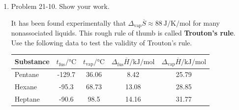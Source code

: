 \documentclass[../psets.tex]{subfiles}
\begin{document}
\begin{enumerate}
\begin{align*}
    \end{align*}
    \begin{proof}[Answer]
        The total differential of $U(T,V)$ is
        \begin{equation*}
            \dd{U} = \left( \pdv{U}{T} \right)_V\dd{T}+\left( \pdv{U}{V} \right)_T\dd{V}
        \end{equation*}
        Thus, we have that
        \begin{align*}
            T\dd{S}-P\dd{V} &= \left( \pdv{U}{T} \right)_V\dd{T}+\left( \pdv{U}{V} \right)_T\dd{V}\\
            \dd{S} &= \frac{1}{T}\left( \pdv{U}{T} \right)_V\dd{T}+\frac{1}{T}\left[ P+\left( \pdv{U}{V} \right)_T \right]\dd{V}\\
            &= \frac{C_V}{T}\dd{T}+\frac{1}{T}\left[ P+\left( \pdv{U}{V} \right)_T \right]\dd{V}
        \end{align*}
        The two equations follow by comparing the above with the total differential for $S(T,V)$, given by
        \begin{equation*}
            \dd{S} = \left( \pdv{S}{T} \right)_V\dd{T}+\left( \pdv{S}{V} \right)_T\dd{V}
        \end{equation*}
    \end{proof}
    \item Problem 21-10. Show your work.\par
    It has been found experimentally that $\Delta_\text{vap}\overline{S}\approx\SI{88}{\joule\per\kelvin\per\mole}$ for many nonassociated liquids. This rough rule of thumb is called \textbf{Trouton's rule}. Use the following data to test the validity of Trouton's rule.
    \begin{center}
        \small
        \renewcommand{\arraystretch}{1.2}
        \begin{tabular}{
            l
            c
            S[table-format=3.2]
            S[table-format=2.2]
            S[table-format=2.2]
        }
            \toprule
            Substance & {$t_\text{fus}/\si{\celsius}$} & {$t_\text{vap}/\si{\celsius}$} & {$\Delta_\text{fus}\overline{H}/\si{\kilo\joule\per\mole}$} & {$\Delta_\text{vap}\overline{H}/\si{\kilo\joule\per\mole}$}\\
            \midrule
            Pentane            & -129.7 & 36.06 & 8.42  & 25.79\\
            Hexane             & -95.3  & 68.73 & 13.08 & 28.85\\
            Heptane            & -90.6  & 98.5  & 14.16 & 31.77\\

\end{tabular}
\end{center}
\end{enumerate}
\end{document}
